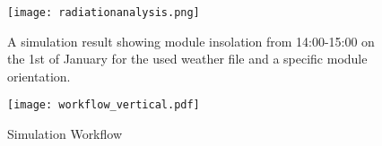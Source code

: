 

\begin{figure}[H]
\begin{center}
\texttt{[image: radiationanalysis.png]}
\caption{A simulation result showing module insolation from 14:00-15:00 on the 1st of January for the used weather file and a specific module orientation.}
\label{fig:radiation}
\end{center}
\end{figure}


\begin{figure}
\begin{center}
\texttt{[image: workflow\_vertical.pdf]}
\caption{Simulation Workflow}
\label{fig:workflow}
\end{center}
\end{figure}